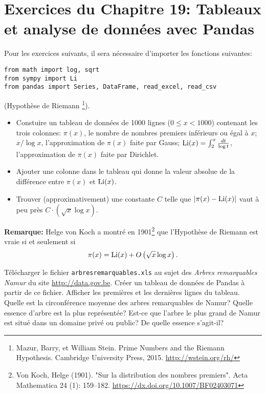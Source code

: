 \section*{Exercices du Chapitre 19: Tableaux et analyse de données avec Pandas}

Pour les exercices suivants, il sera nécessaire d'importer les fonctions
suivantes:
\begin{verbatim}
from math import log, sqrt
from sympy import Li
from pandas import Series, DataFrame, read_excel, read_csv
\end{verbatim}

\begin{exercice}
(Hypothèse de Riemann
\footnote{Mazur, Barry, et William Stein. Prime Numbers and the Riemann Hypothesis.
Cambridge University Press, 2015. \url{http://wstein.org/rh/}}).
\begin{itemize}
    \item Constuire un tableau de données de 1000 lignes ($0\leq
    x< 1000$) contenant les trois colonnes: 
    $\pi(x)$, le nombre de nombres premiers inférieurs ou égal à $x$;
    $x/\log x$, l'approximation de $\pi(x)$ faite par Gauss;
    ${\rm Li}(x)=\int_2^x \frac{dt}{\log t }$, l'approximation de $\pi(x)$
faite par Dirichlet.
    \item Ajouter une colonne dans le tableau qui donne la valeur absolue de la
différence entre $\pi(x)$ et ${\rm Li}(x)$. 
\end{itemize}
\begin{itemize}
\item Trouver (approximativement) une constante $C$ telle que
    $|\pi(x) - {\rm Li} (x)|$ vaut à peu près $C\cdot\left(\sqrt x \log x\right)$.
\end{itemize}
\noindent\textbf{Remarque:}
Helge von Koch a montré en
1901\footnote{
Von Koch, Helge (1901). "Sur la distribution des nombres premiers". Acta
Mathematica 24 (1): 159–182.
\url{https://dx.doi.org/10.1007/BF02403071}} que l'Hypothèse de Riemann 
est vraie si et seulement si 
\[
    \pi(x) = {\rm Li} (x) +  O\left(\sqrt x \log x\right). 
\]
\end{exercice}

\begin{exercice}
Télécharger le fichier \texttt{arbresremarquables.xls} au sujet des \emph{Arbres
remarquables Namur} du site \url{http://data.gov.be}. Créer un tableau de
données de Pandas à partir de ce fichier. Afficher les premières
et les dernières lignes du tableau. Quelle est la circonférence moyenne des
arbres remarquables de Namur? Quelle essence d'arbre est la plus représentée?
Est-ce que l'arbre le plus grand de Namur est situé dans un domaine privé ou
public? De quelle essence s'agit-il?
\end{exercice}


